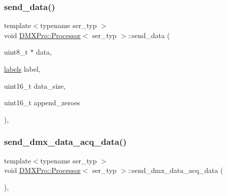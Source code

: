 \subsubsection{\texorpdfstring{send\+\_\+data()}{send\_data()}}
{\footnotesize\ttfamily template$<$typename ser\+\_\+typ $>$ \\
void \hyperlink{classDMXPro_1_1Processor}{D\+M\+X\+Pro\+::\+Processor}$<$ ser\+\_\+typ $>$\+::send\+\_\+data (\begin{DoxyParamCaption}\item[{uint8\+\_\+t $\ast$}]{data,  }\item[{\hyperlink{namespaceDMXPro_a001319de95203723f1bd253fec3186cd}{labels}}]{label,  }\item[{uint16\+\_\+t}]{data\+\_\+size,  }\item[{uint16\+\_\+t}]{append\+\_\+zeroes }\end{DoxyParamCaption})\hspace{0.3cm}{\ttfamily [inline]}, {\ttfamily [private]}}

\mbox{\label{classDMXPro_1_1Processor_a27f23f48cc4fe881915e813a972eb43b}} 
\subsubsection{\texorpdfstring{send\+\_\+dmx\+\_\+data\+\_\+acq\+\_\+data()}{send\_dmx\_data\_acq\_data()}}
{\footnotesize\ttfamily template$<$typename ser\+\_\+typ $>$ \\
void \hyperlink{classDMXPro_1_1Processor}{D\+M\+X\+Pro\+::\+Processor}$<$ ser\+\_\+typ $>$\+::send\+\_\+dmx\+\_\+data\+\_\+acq\+\_\+data (\begin{DoxyParamCaption}{ }\end{DoxyParamCaption})\hspace{0.3cm}{\ttfamily [inline]}, {\ttfamily [private]}}

\mbox{\label{classDMXPro_1_1Processor_a3632542df4aae7719d6ab2e964271e36}} 
